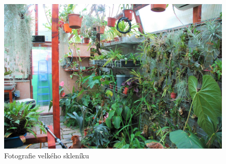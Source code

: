 \begin{figure}[htbp]
    \includegraphics[width=\textwidth]{img/VS_5.jpg}
    \caption{Fotografie velkého skleníku}
    \label{fig:VS5} 
\end{figure}